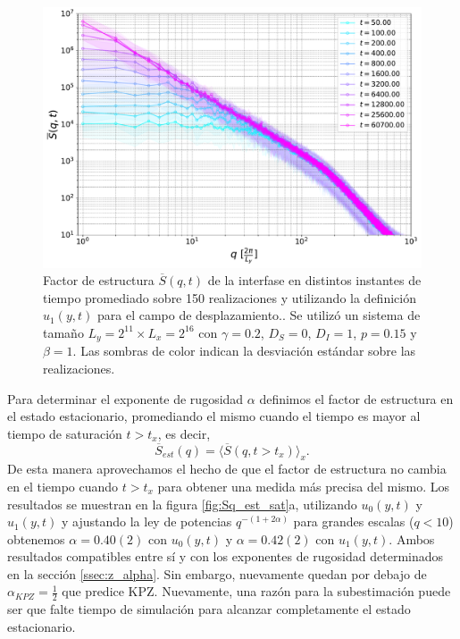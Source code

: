 \begin{figure}[!t]
    \centering
    \includegraphics[width=\imsizeL]{Sq_t.pdf}
    \caption{Factor de estructura $\overline{S}(q,t)$ de la interfase en distintos instantes de tiempo promediado sobre 150 realizaciones y utilizando la definición $u_1(y,t)$ para el campo de desplazamiento.. Se utilizó un sistema de tamaño $L_y = 2^{11}\times L_x = 2^{16}$ con $\gamma = 0.2$, $D_S = 0$, $D_I = 1$, $p = 0.15$ y $\beta = 1$. Las sombras de color indican la desviación estándar sobre las realizaciones.}
    \label{fig:Sq_t}
\end{figure}

Para determinar el exponente de rugosidad $\alpha$ definimos el factor de estructura en el estado estacionario, promediando el mismo cuando el tiempo es mayor al tiempo de saturación $t>t_x$, es decir, 
\begin{equation}
    \overline{S}_{est}(q) = \langle \overline{S}(q,t>t_x) \rangle_x.   
\end{equation}
De esta manera aprovechamos el hecho de que el factor de estructura no cambia en el tiempo cuando $t>t_x$ para obtener una medida más precisa del mismo. Los resultados se muestran en la figura \ref{fig:Sq_est_sat}a, utilizando $u_0(y,t)$ y $u_1(y,t)$ y ajustando la ley de potencias $q^{-(1+2\alpha)}$ para grandes escalas ($q<10$) obtenemos $\alpha = 0.40(2)$ con $u_0(y,t)$ y $\alpha = 0.42(2)$ con $u_1(y,t)$. Ambos resultados compatibles entre sí y con los exponentes de rugosidad determinados en la sección \ref{ssec:z_alpha}. Sin embargo, nuevamente quedan por debajo de $\alpha_{KPZ}=\frac{1}{2}$ que predice KPZ. Nuevamente, una razón para la subestimación puede ser que falte tiempo de simulación para alcanzar completamente el estado estacionario.

